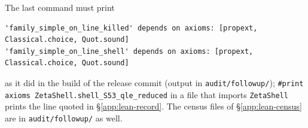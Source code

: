 The last command must print
\begin{Verbatim}[fontsize=\footnotesize,xleftmargin=1em]
'family_simple_on_line_killed' depends on axioms: [propext, Classical.choice, Quot.sound]
'family_simple_on_line_shell' depends on axioms: [propext, Classical.choice, Quot.sound]
\end{Verbatim}
as it did in the build of the release commit (output in
\texttt{audit/followup/}); \texttt{\#print axioms ZetaShell.shell\_S53\_qle\_reduced} in a
file that imports \texttt{ZetaShell} prints the line quoted in \S\ref{app:lean-record}. The census files of \S\ref{app:lean-census} are in \texttt{audit/followup/} as well.
